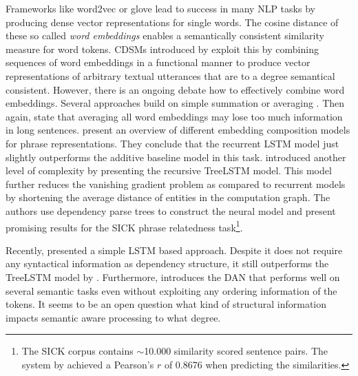 Frameworks like word2vec \autocite{mikolov_distributed_2013} or glove \autocite{pennington_glove_2014} lead to success in many \ac{NLP} tasks by producing dense vector representations for single words. The cosine distance of these so called \textit{word embeddings} enables a semantically consistent similarity measure for word tokens. \acp{CDSM} introduced by \textcite{clark_compositional_2008} exploit this by combining sequences of word embeddings in a functional manner to produce vector representations of arbitrary textual utterances that are to a degree semantical consistent. However, there is an ongoing debate how to effectively combine word embeddings. Several approaches build on simple summation or averaging \autocite{habernal_exploiting_2015,boltuzic_identifying_2015,misra_measuring_2016}. Then again, \Textcite{misra_measuring_2016} state that averaging all word embeddings may lose too much information in long sentences. \Textcite{wang_comparison_2017} present an overview of different embedding composition models for phrase representations. They conclude that the recurrent \ac{LSTM} model \autocite{hochreiter_long_1997} just slightly outperforms the additive baseline model in this task. \Textcite{tai_improved_2015} introduced another level of complexity by presenting the recursive TreeLSTM model. This model further reduces the vanishing gradient problem as compared to recurrent models by shortening the average distance of entities in the computation graph. The authors use dependency parse trees to construct the neural model and present promising results for the SICK phrase relatedness task\footnote{The SICK corpus \autocite{marelli_sick_2014} contains $\sim$10.000 similarity scored sentence pairs. The system by \Textcite{tai_improved_2015} achieved a Pearson's $r$ of 0.8676 when predicting the similarities.}. 

Recently, \Textcite{mueller_siamese_2016} presented a simple \ac{LSTM} based approach. Despite it does not require any syntactical information as dependency structure, it still outperforms the TreeLSTM model by \textcite{tai_improved_2015}. Furthermore, \Textcite{iyyer_deep_2015} introduces the \ac{DAN} that performs well on several semantic tasks even without exploiting any ordering information of the tokens. It seems to be an open question what kind of structural information impacts semantic aware processing to what degree.




